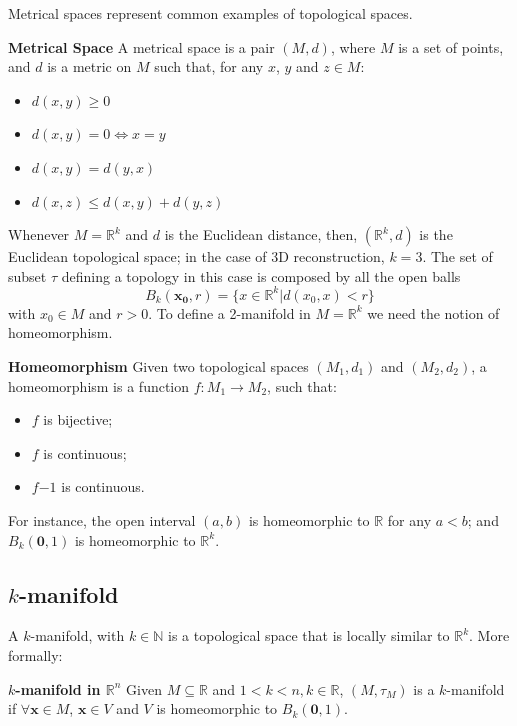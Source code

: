 Metrical spaces represent common examples of topological spaces. 
\begin{mydef}
  \textbf{Metrical Space}  
A metrical space is a pair $(M, d)$, where $M$ is a set of points, and $d$ is a metric on $M$ such that, for any $x$, $y$ and $z \in M$:
\begin{itemize}
  \item $d(x, y) \geq 0$
  \item $d(x, y) = 0 \Longleftrightarrow x = y$
  \item $d(x, y) = d(y, x)$
  \item $d(x, z) \leq d(x, y) + d(y, z)$
\end{itemize}

\end{mydef}


Whenever $M = \mathbb{R}^k$ and $d$ is the Euclidean distance, then, $(\mathbb{R}^k, d)$ is the Euclidean topological space; in the case of 3D reconstruction, $k=3$.
The set of subset $\tau$ defining a topology in this case is composed by all the open balls
\[
B_k(\mathbf{x_0}, r) = \{x \in \mathbb{R}^k | d(x_0, x) < r\}
\]
with $x_0 \in M$ and $r > 0$.
To define a 2-manifold in $M = \mathbb{R}^k$  we need the notion of homeomorphism.

\begin{mydef}
   \textbf{Homeomorphism}
   Given two topological spaces $(M_1, d_1)$ and $(M_2, d_2)$, a homeomorphism is a function $f:M_1\longrightarrow M_2$, such that:
   \begin{itemize}
    \item $f$ is bijective;
    \item $f$ is continuous;
    \item $f{-1}$ is continuous.
   \end{itemize}
\end{mydef}

For instance, the open interval $(a, b)$ is homeomorphic to $\mathbb{R}$ for any $a < b$; and $B_k(\mathbf{0}, 1)$ is homeomorphic to $\mathbb{R}^k$. 

\subsection{\texorpdfstring{$k$}{k}-manifold} 
A $k$-manifold, with $k \in \mathbb{N}$ is a topological space that is locally similar to $\mathbb{R}^k$. More formally:

\begin{mydef}
 \textbf{$k$-manifold in $\mathbb{R}^n$}
 Given $M \subseteq \mathbb{R}$ and $1 < k < n, k \in \mathbb{R}$, $(M, \tau_M)$ is a $k$-manifold if $\forall \mathbf{x} \in M$, $\mathbf{x} \in V$ and $V$ is homeomorphic to $B_k(\mathbf{0}, 1)$.
\end{mydef}

